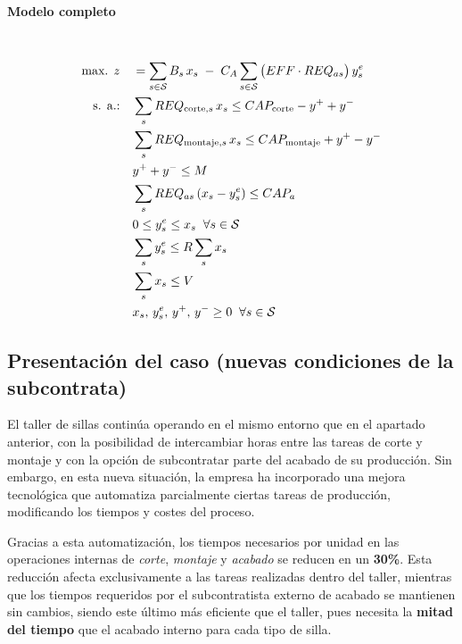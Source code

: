 \paragraph{Modelo completo}\mbox{}\\
\begin{align}
\mbox{max. } z \quad &= \sum_{s \in \mathcal{S}} B_s\, x_s \;-\; C_A \sum_{s \in \mathcal{S}} \big(EFF \cdot REQ_{a s}\big)\, y_s^{e} \notag \\
\mbox{s. a.:} \quad 
& \sum_{s} REQ_{\text{corte},s}\, x_s \le CAP_{\text{corte}} - y^+ + y^- \notag \\
& \sum_{s} REQ_{\text{montaje},s}\, x_s \le CAP_{\text{montaje}} + y^+ - y^- \notag \\
& y^+ + y^- \le M \notag \\
& \sum_{s} REQ_{a s}\,(x_s - y_s^{e}) \le CAP_a \notag \\
& 0 \le y_s^{e} \le x_s \;\; \forall s \in \mathcal{S} \notag \\
& \sum_{s} y_s^{e} \le R \sum_{s} x_s \notag \\
& \sum_{s} x_s \le V \notag \\
& x_s,\, y_s^{e},\, y^+,\, y^- \ge 0 \;\; \forall s \in \mathcal{S} \notag
\end{align}




\subsection{Presentación del caso (nuevas condiciones de la subcontrata)}


El taller de sillas continúa operando en el mismo entorno que en el apartado anterior, con la posibilidad de intercambiar horas entre las tareas de corte y montaje y con la opción de subcontratar parte del acabado de su producción. Sin embargo, en esta nueva situación, la empresa ha incorporado una mejora tecnológica que automatiza parcialmente ciertas tareas de producción, modificando los tiempos y costes del proceso.

Gracias a esta automatización, los tiempos necesarios por unidad en las operaciones internas de \textit{corte}, \textit{montaje} y \textit{acabado} se reducen en un \textbf{30\%}. Esta reducción afecta exclusivamente a las tareas realizadas dentro del taller, mientras que los tiempos requeridos por el subcontratista externo de acabado se mantienen sin cambios, siendo este último más eficiente que el taller, pues necesita la \textbf{mitad del tiempo} que el acabado interno para cada tipo de silla.

